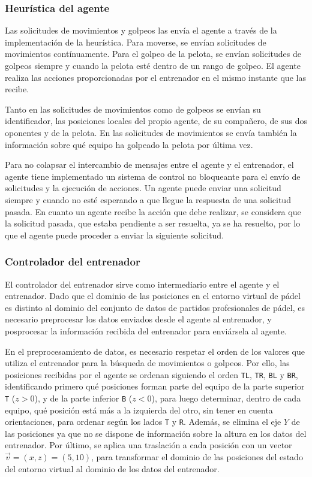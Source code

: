 \subsubsection{Heurística del agente}

Las solicitudes de movimientos y golpeos las envía el agente a través de la implementación de la heurística. Para moverse, se envían solicitudes de movimientos contínuamente. Para el golpeo de la pelota, se envían solicitudes de golpeos siempre y cuando la pelota esté dentro de un rango de golpeo. El agente realiza las acciones proporcionadas por el entrenador en el mismo instante que las recibe.

Tanto en las solicitudes de movimientos como de golpeos se envían su identificador, las posiciones locales del propio agente, de su compañero, de sus dos oponentes y de la pelota. En las solicitudes de movimientos se envía también la información sobre qué equipo ha golpeado la pelota por última vez.

Para no colapsar el intercambio de mensajes entre el agente y el entrenador, el agente tiene implementado un sistema de control no bloqueante para el envío de solicitudes y la ejecución de acciones. Un agente puede enviar una solicitud siempre y cuando no esté esperando a que llegue la respuesta de una solicitud pasada. En cuanto un agente recibe la acción que debe realizar, se considera que la solicitud pasada, que estaba pendiente a ser resuelta, ya se ha resuelto, por lo que el agente puede proceder a enviar la siguiente solicitud.

\subsubsection{Controlador del entrenador}

El controlador del entrenador sirve como intermediario entre el agente y el entrenador. Dado que el dominio de las posiciones en el entorno virtual de pádel es distinto al dominio del conjunto de datos de partidos profesionales de pádel, es necesario preprocesar los datos enviados desde el agente al entrenador, y posprocesar la información recibida del entrenador para enviársela al agente.

En el preprocesamiento de datos, es necesario respetar el orden de los valores que utiliza el entrenador para la búsqueda de movimientos o golpeos. Por ello, las posiciones recibidas por el agente se ordenan siguiendo el orden \texttt{TL}, \texttt{TR}, \texttt{BL} y \texttt{BR}, identificando primero qué posiciones forman parte del equipo de la parte superior \texttt{T} ($z > 0$), y de la parte inferior \texttt{B} ($z < 0$), para luego determinar, dentro de cada equipo, qué posición está más a la izquierda del otro, sin tener en cuenta orientaciones, para ordenar según los lados \texttt{T} y \texttt{R}. Además, se elimina el eje $Y$ de las posiciones ya que no se dispone de información sobre la altura en los datos del entrenador. Por último, se aplica una traslación a cada posición con un vector $\vec{v} = (x, z) = (5, 10)$, para transformar el dominio de las posiciones del estado del entorno virtual al dominio de los datos del entrenador.

